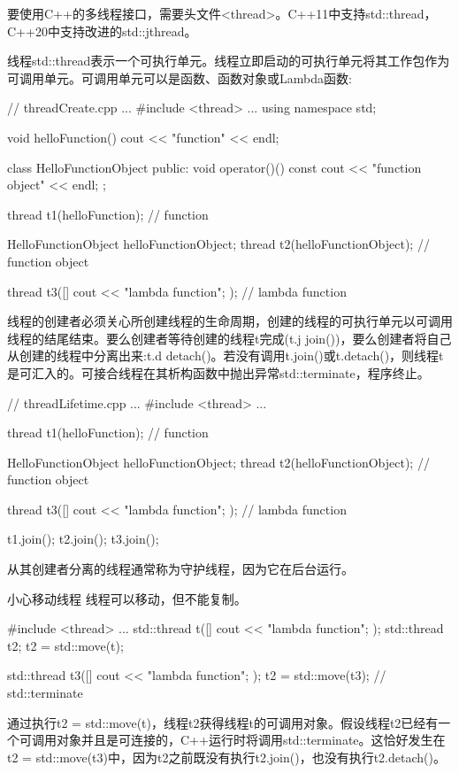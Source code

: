 
要使用C++的多线程接口，需要头文件<thread>。C++11中支持std::thread，C++20中支持改进的std::jthread。



线程std::thread表示一个可执行单元。线程立即启动的可执行单元将其工作包作为可调用单元。可调用单元可以是函数、函数对象或Lambda函数:


\begin{cpp}
// threadCreate.cpp
...
#include <thread>
...
using namespace std;

void helloFunction(){
	cout << "function" << endl;
}

class HelloFunctionObject {
public:
	void operator()() const {
		cout << "function object" << endl;
	}
};

thread t1(helloFunction); // function

HelloFunctionObject helloFunctionObject;
thread t2(helloFunctionObject); // function object

thread t3([]{ cout << "lambda function"; }); // lambda function
\end{cpp}


线程的创建者必须关心所创建线程的生命周期，创建的线程的可执行单元以可调用线程的结尾结束。要么创建者等待创建的线程t完成(t.j join())，要么创建者将自己从创建的线程中分离出来:t.d detach()。若没有调用t.join()或t.detach()，则线程t是可汇入的。可接合线程在其析构函数中抛出异常std::terminate，程序终止。


\begin{cpp}
// threadLifetime.cpp
...
#include <thread>
...

thread t1(helloFunction); // function

HelloFunctionObject helloFunctionObject;
thread t2(helloFunctionObject); // function object

thread t3([]{ cout << "lambda function"; }); // lambda function

t1.join();
t2.join();
t3.join();
\end{cpp}

从其创建者分离的线程通常称为守护线程，因为它在后台运行。

\begin{myWarning}{小心移动线程}
线程可以移动，但不能复制。

\begin{cpp}
#include <thread>
...
std::thread t([]{ cout << "lambda function"; });
std::thread t2;
t2 = std::move(t);

std::thread t3([]{ cout << "lambda function"; });
t2 = std::move(t3); // std::terminate
\end{cpp}

通过执行t2 = std::move(t)，线程t2获得线程t的可调用对象。假设线程t2已经有一个可调用对象并且是可连接的，C++运行时将调用std::terminate。这恰好发生在t2 = std::move(t3)中，因为t2之前既没有执行t2.join()，也没有执行t2.detach()。
\end{myWarning}

